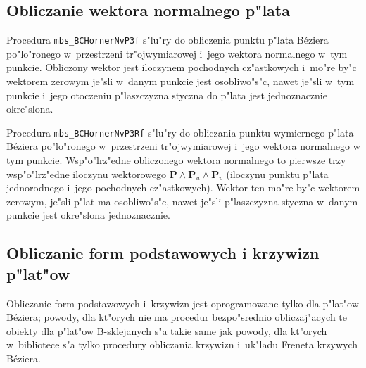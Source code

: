 \subsection{Obliczanie wektora normalnego p"lata}


\hspace*{\parindent}
Procedura \texttt{mbs\_BCHornerNvP3f} s"lu"ry do obliczenia punktu
p"lata B\'{e}ziera po"lo"ronego w~przestrzeni tr"ojwymiarowej i~jego wektora
normalnego w~tym
punkcie. Obliczony wektor jest iloczynem pochodnych cz"astkowych i~mo"re
by"c wektorem zerowym je"sli w~danym punkcie jest osobliwo"s"c, nawet je"sli
w~tym punkcie i~jego otoczeniu p"laszczyzna styczna do p"lata jest
jednoznacznie okre"slona.

\vspace{\bigskipamount}
Procedura \texttt{mbs\_BCHornerNvP3Rf} s"lu"ry do obliczania punktu
wymiernego p"lata B\'{e}ziera po"lo"ronego w~przestrzeni tr"ojwymiarowej
i~jego wektora normalnego w tym punkcie. Wsp"o"lrz"edne obliczonego wektora
normalnego to pierwsze trzy wsp"o"lrz"edne iloczynu wektorowego
$\bm{P}\wedge\bm{P}_u\wedge\bm{P}_v$ (iloczynu punktu p"lata jednorodnego
i~jego pochodnych cz"astkowych). Wektor ten mo"re by"c wektorem zerowym,
je"sli p"lat ma osobliwo"s"c, nawet je"sli p"laszczyzna styczna w~danym
punkcie jest okre"slona jednoznacznie.


\subsection{Obliczanie form podstawowych i krzywizn p"lat"ow}

Obliczanie form podstawowych i~krzywizn jest oprogramowane tylko dla
p"lat"ow B\'{e}ziera; powody, dla kt"orych nie ma procedur bezpo"srednio
obliczaj"acych te obiekty dla p"lat"ow B-sklejanych s"a takie same jak
powody, dla kt"orych w~bibliotece s"a tylko procedury obliczania krzywizn
i~uk"ladu Freneta krzywych B\'{e}ziera.

